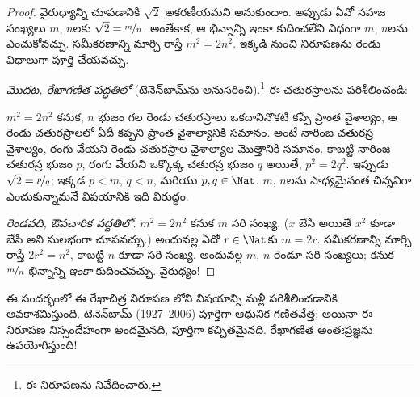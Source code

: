 \documentclass[../../../include/open-logic-section]{subfiles}
\begin{document}
\begin{proof}
వైరుధ్యాన్ని చూపడానికి $\sqrt{2}$ అకరణీయమని అనుకుందాం. అప్పుడు ఏవో సహజ
సంఖ్యలు $m$, $n$లకు $\sqrt{2} = \nicefrac{m}{n}$. అంతేకాక, ఆ భిన్నాన్ని
ఇంకా కుదించలేని విధంగా $m$, $n$లను ఎంచుకోవచ్చు. సమీకరణాన్ని మార్చి రాస్తే
$m^{2} = 2n^{2}$. ఇక్కడి నుంచి నిరూపణను రెండు విధాలుగా పూర్తి చేయవచ్చు.

\emph{మొదట, రేఖాగణిత పద్ధతిలో} (టెనెన్‌బామ్‌ను అనుసరించి).\footnote{ఈ
నిరూపణను \cite{Conway2006} నివేదించారు.} ఈ చతురస్రాలను పరిశీలించండి:
\begin{center}
\end{center}
$m^2 = 2n^2$ కనుక, $n$ భుజం గల రెండు చతురస్రాలు ఒకదానినొకటి కప్పే
ప్రాంత వైశాల్యం, ఆ రెండు చతురస్రాలలో ఏదీ కప్పని ప్రాంత వైశాల్యానికి
సమానం. అంటే నారింజ చతురస్ర వైశాల్యం, రంగు వేయని రెండు చతురస్రాల
వైశాల్యాల మొత్తానికి సమానం. కాబట్టి నారింజ చతురస్ర భుజం $p$, రంగు
వేయని ఒక్కొక్క చతురస్ర భుజం $q$ అయితే, $p^2 = 2q^2$. ఇప్పుడు
$\sqrt{2} = \nicefrac{p}{q}$; ఇక్కడ $p < m$, $q < n$, మరియు
$p, q \in \Nat$. $m$, $n$లను సాధ్యమైనంత చిన్నవిగా ఎంచుకున్నామనే విషయానికి ఇది
విరుద్ధం.

\emph{రెండవది, ఔపచారిక పద్ధతిలో.} $m^{2} = 2n^{2}$ కనుక $m$ సరి సంఖ్య.
($x$ బేసి అయితే $x^2$ కూడా బేసి అని సులభంగా చూపవచ్చు.) అందువల్ల
ఏదో $r \in \Nat$కు $m = 2r$. సమీకరణాన్ని మార్చి రాస్తే $2r^2 = n^2$,
కాబట్టి $n$ కూడా సరి సంఖ్య. అందువల్ల $m$, $n$ రెండూ సరి సంఖ్యలు;
కనుక $\nicefrac{m}{n}$ భిన్నాన్ని \emph{ఇంకా} కుదించవచ్చు. వైరుధ్యం!
\end{proof}

ఈ సందర్భంలో ఈ రేఖాచిత్ర నిరూపణ
లోని విషయాన్ని మళ్లీ పరిశీలించడానికి
అవకాశమిస్తుంది. టెనెన్‌బామ్ (1927--2006) పూర్తిగా ఆధునిక గణితవేత్త;
అయినా ఈ నిరూపణ నిస్సందేహంగా అందమైనది, పూర్తిగా కచ్చితమైనది. రేఖాగణిత
అంతఃప్రజ్ఞను ఉపయోగిస్తుంది!
\end{document}
